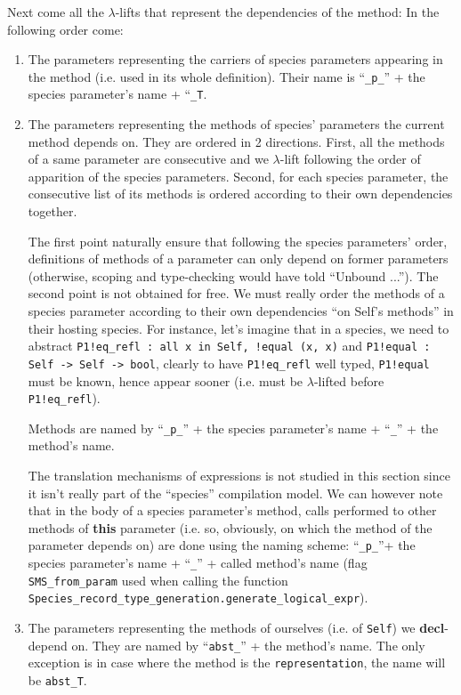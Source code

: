 \medskip
Next come all the $\lambda$-lifts that represent the dependencies of
the method: In the following order come:
\begin{enumerate}
\item The parameters representing the carriers of species parameters
  appearing in the method (i.e. used in its whole definition). Their
  name is ``{\tt \_p\_}'' + the species parameter's name +
  ``{\tt \_T}. 
\item The parameters representing the methods of species' parameters
  the current method depends on. They are ordered in 2
  directions. First, all the methods of a same parameter are
  consecutive and we $\lambda$-lift following the order of apparition of
  the species parameters. Second, for each species parameter, the
  consecutive list of its methods is ordered according to their own
  dependencies together.

  The first point naturally ensure that following the species
  parameters' order, definitions of methods of a parameter can only
  depend on former parameters (otherwise, scoping and type-checking
  would have told ``Unbound ...''). The second point is not obtained
  for free. We must really order the methods of a species parameter
  according to their own dependencies ``on Self's methods'' in their
  hosting species. For instance, let's imagine that in a species, we
  need to abstract
  {\tt P1!eq\_refl : all x in Self, !equal (x, x)} and
  {\tt P1!equal : Self -> Self -> bool}, clearly to have
  {\tt P1!eq\_refl} well typed, {\tt P1!equal} must be known, hence
  appear sooner (i.e. must be $\lambda$-lifted before
  {\tt P1!eq\_refl}).

  Methods are named by ``{\tt \_p\_}'' + the species parameter's name
  + ``{\tt \_}'' + the method's name.

  The translation mechanisms of expressions is not studied in this
  section since it isn't really part of the ``species'' compilation
  model. We can however note that in the body of a species
  parameter's method, calls performed to other methods of {\bf this}
  parameter (i.e. so, obviously, on which the method of the parameter
  depends on) are done using the naming scheme: ``{\tt \_p\_}''+ the
  species parameter's name + ``{\tt \_}'' + called method's name (flag
  {\tt SMS\_from\_param} used when calling the function \\
  {\tt Species\_record\_type\_generation.generate\_logical\_expr}).

\item The parameters representing the methods of ourselves (i.e. of
  {\tt Self}) we {\bf decl}-depend on. They are named by
  ``{\tt abst\_}'' + the method's name. The only exception is in case
  where the method is the {\tt representation}, the name will be
  {\tt abst\_T}.


\end{enumerate}

